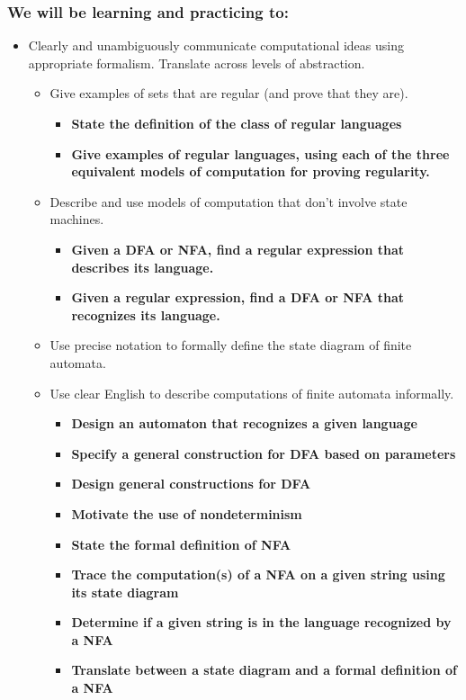 \subsubsection*{We will be learning and practicing to:}
\begin{itemize}
\item Clearly and unambiguously communicate computational ideas using appropriate formalism. Translate across levels of abstraction.
\begin{itemize}
   \item Give examples of sets that are regular (and prove that they are).
   \begin{itemize}
      \item {\bf State the definition of the class of regular languages}
      \item {\bf Give examples of regular languages, using each of the three equivalent models of computation for proving regularity.}
   \end{itemize}
   \item Describe and use models of computation that don't involve state machines.
   \begin{itemize}
      \item {\bf Given a DFA or NFA, find a regular expression that describes its language.}
      \item {\bf Given a regular expression, find a DFA or NFA that recognizes its language.}
   \end{itemize}
   \item Use precise notation to formally define the state diagram of finite automata.
   \item Use clear English to describe computations of finite automata informally.
   \begin{itemize}
      \item {\bf Design an automaton that recognizes a given language}
      \item {\bf Specify a general construction for DFA based on parameters}
      \item {\bf Design general constructions for DFA}
      \item {\bf Motivate the use of nondeterminism}
      \item {\bf State the formal definition of NFA}   
      \item {\bf Trace the computation(s) of a NFA on a given string using its state diagram}
      \item {\bf Determine if a given string is in the language recognized by a NFA}
      \item {\bf Translate between a state diagram and a formal definition of a NFA}
   \end{itemize}
\end{itemize}


\end{itemize}
